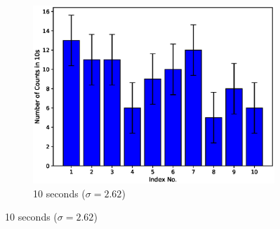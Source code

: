 \begin{figure}
    \begin{subfigure}{\linewidth}
        \centering
        \includegraphics[width=1\columnwidth]{images/spread1.eps}
        \caption{10 seconds ($\sigma = 2.62$)}
    \end{subfigure}
\end{figure}
